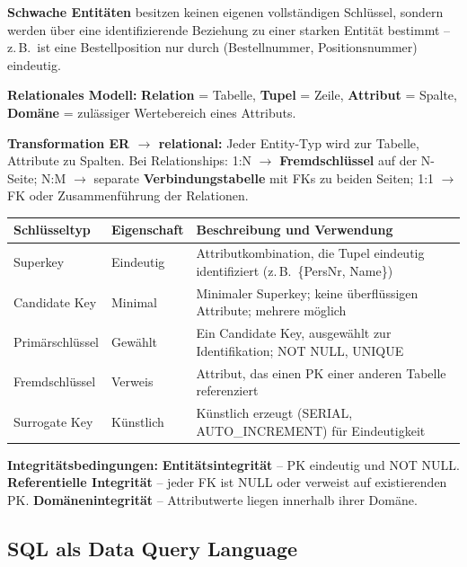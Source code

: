 \textbf{Schwache Entitäten} besitzen keinen eigenen vollständigen Schlüssel, sondern werden über eine identifizierende Beziehung zu einer starken Entität bestimmt -- z.\,B.\ ist eine Bestellposition nur durch (Bestellnummer, Positionsnummer) eindeutig.

\textbf{Relationales Modell:} \textbf{Relation} = Tabelle, \textbf{Tupel} = Zeile, \textbf{Attribut} = Spalte, \textbf{Domäne} = zulässiger Wertebereich eines Attributs.

\textbf{Transformation ER $\to$ relational:} Jeder Entity-Typ wird zur Tabelle, Attribute zu Spalten. Bei Relationships: 1:N $\to$ \textbf{Fremdschlüssel} auf der N-Seite; N:M $\to$ separate \textbf{Verbindungstabelle} mit FKs zu beiden Seiten; 1:1 $\to$ FK oder Zusammenführung der Relationen.

\begin{table}[H]
  \centering
  \begin{tabularx}{\linewidth}{L{2.5cm} L{4cm} L{8.5cm}}
    \textbf{Schlüsseltyp} & \textbf{Eigenschaft} & \textbf{Beschreibung und Verwendung}                                                \\
    \midrule
    Superkey              & Eindeutig            & Attributkombination, die Tupel eindeutig identifiziert (z.\,B.\ \{PersNr, Name\})   \\
    Candidate Key         & Minimal              & Minimaler Superkey; keine überflüssigen Attribute; mehrere möglich                  \\
    Primärschlüssel       & Gewählt              & Ein Candidate Key, ausgewählt zur Identifikation; NOT NULL, UNIQUE                  \\
    Fremdschlüssel        & Verweis              & Attribut, das einen PK einer anderen Tabelle referenziert                           \\
    Surrogate Key         & Künstlich            & Künstlich erzeugt (SERIAL, AUTO\_INCREMENT) für Eindeutigkeit                       \\
  \end{tabularx}
\end{table}

\textbf{Integritätsbedingungen:} \textbf{Entitätsintegrität} -- PK eindeutig und NOT NULL. \textbf{Referentielle Integrität} -- jeder FK ist NULL oder verweist auf existierenden PK. \textbf{Domänenintegrität} -- Attributwerte liegen innerhalb ihrer Domäne.

\newpage

\subsection{SQL als Data Query Language}

